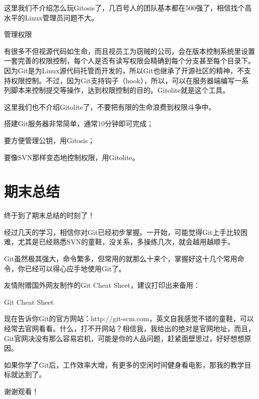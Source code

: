 这里我们不介绍怎么玩Gitosis了，几百号人的团队基本都在500强了，相信找个高水平的Linux管理员问题不大。

管理权限

有很多不但视源代码如生命，而且视员工为窃贼的公司，会在版本控制系统里设置一套完善的权限控制，每个人是否有读写权限会精确到每个分支甚至每个目录下。因为Git是为Linux源代码托管而开发的，所以Git也继承了开源社区的精神，不支持权限控制。不过，因为Git支持钩子（hook），所以，可以在服务器端编写一系列脚本来控制提交等操作，达到权限控制的目的。Gitolite就是这个工具。

这里我们也不介绍Gitolite了，不要把有限的生命浪费到权限斗争中。

\begin{tcolorbox}

搭建Git服务器非常简单，通常10分钟即可完成；

要方便管理公钥，用Gitosis；

要像SVN那样变态地控制权限，用Gitolite。
\end{tcolorbox}

\chapter{期末总结}

终于到了期末总结的时刻了！

经过几天的学习，相信你对Git已经初步掌握。一开始，可能觉得Git上手比较困难，尤其是已经熟悉SVN的童鞋，没关系，多操练几次，就会越用越顺手。

Git虽然极其强大，命令繁多，但常用的就那么十来个，掌握好这十几个常用命令，你已经可以得心应手地使用Git了。

友情附赠国外网友制作的Git Cheat Sheet，建议打印出来备用：

Git Cheat Sheet

现在告诉你Git的官方网站：http://git-scm.com，英文自我感觉不错的童鞋，可以经常去官网看看。什么，打不开网站？相信我，我给出的绝对是官网地址，而且，Git官网决没有那么容易宕机，可能是你的人品问题，赶紧面壁思过，好好想想原因。

如果你学了Git后，工作效率大增，有更多的空闲时间健身看电影，那我的教学目标就达到了。

谢谢观看！















